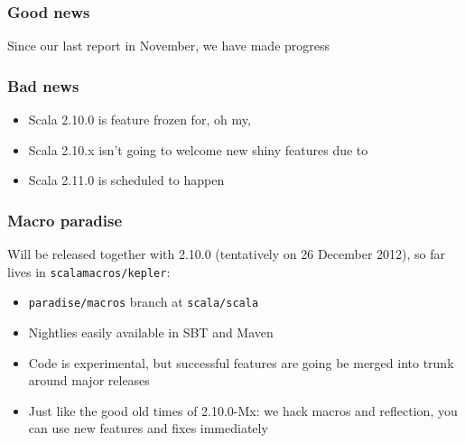 \documentclass[svgnames,hyperref={bookmarks=false}]{beamer}
\begin{document}
\begin{frame}[fragile]
\frametitle{Good news}

Since our last report in November, we have made progress
\end{frame}

\begin{frame}[fragile]
\frametitle{Bad news}

\begin{itemize}
\item Scala 2.10.0 is feature frozen for, oh my, 
\item Scala 2.10.x isn't going to welcome new shiny features due to 
\item Scala 2.11.0 is scheduled to happen 
\end{itemize}
\end{frame}

\begin{frame}[fragile]
\frametitle{Macro paradise}

Will be released together with 2.10.0 (tentatively on 26 December 2012), so far lives in \texttt{scalamacros/kepler}:

\begin{itemize}
\item \texttt{paradise/macros} branch at \texttt{scala/scala}
\item Nightlies easily available in SBT and Maven
\item Code is experimental, but successful features are going be merged into trunk around major releases
\item Just like the good old times of 2.10.0-Mx: we hack macros and reflection, you can use new features and fixes immediately
\end{itemize}
\end{frame}

\begin{frame}[fragile]
\frametitle{}

\vskip40pt
\begin{center}
\end{center}
\end{frame}
\end{document}
